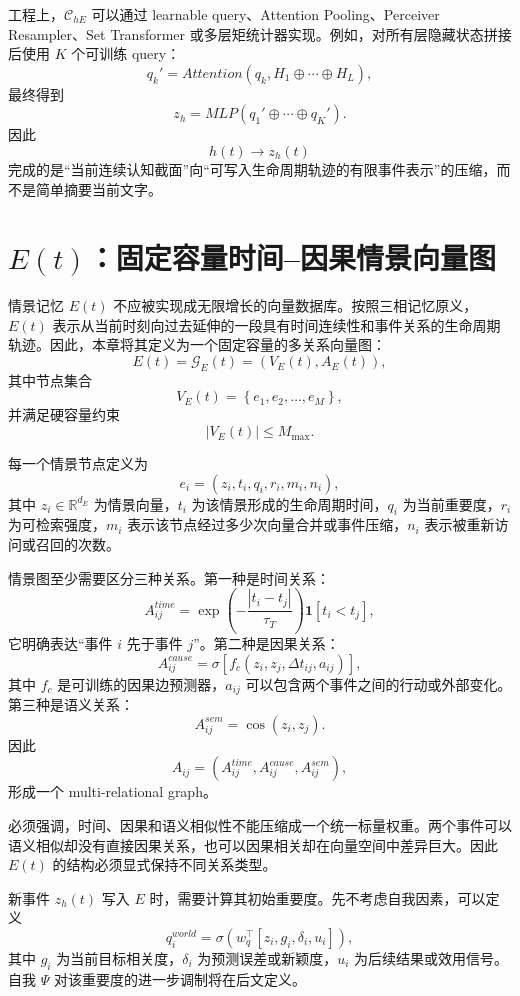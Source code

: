 工程上，$\mathcal{C}_{hE}$ 可以通过 learnable query、Attention Pooling、Perceiver Resampler、Set Transformer 或多层矩统计器实现。例如，对所有层隐藏状态拼接后使用 $K$ 个可训练 query：
\[
q_k'
=
Attention
\left(
q_k,
H_1\oplus\cdots\oplus H_L
\right),
\]
最终得到
\[
z_h
=
MLP
\left(
q_1'\oplus\cdots\oplus q_K'
\right).
\]
因此
\[
\boxed{
h(t)
\rightarrow
z_h(t)
}
\]
完成的是“当前连续认知截面”向“可写入生命周期轨迹的有限事件表示”的压缩，而不是简单摘要当前文字。

\section{$E(t)$：固定容量时间--因果情景向量图}

情景记忆 $E(t)$ 不应被实现成无限增长的向量数据库。按照三相记忆原义，$E(t)$ 表示从当前时刻向过去延伸的一段具有时间连续性和事件关系的生命周期轨迹。因此，本章将其定义为一个固定容量的多关系向量图：
\[
E(t)
=
\mathcal{G}_E(t)
=
\left(
V_E(t),A_E(t)
\right),
\]
其中节点集合
\[
V_E(t)
=
\left\{
e_1,e_2,\ldots,e_M
\right\},
\]
并满足硬容量约束
\[
|V_E(t)|
\leq
M_{\max}.
\]

每一个情景节点定义为
\[
e_i
=
\left(
z_i,
t_i,
q_i,
r_i,
m_i,
n_i
\right),
\]
其中 $z_i\in\mathbb{R}^{d_E}$ 为情景向量，$t_i$ 为该情景形成的生命周期时间，$q_i$ 为当前重要度，$r_i$ 为可检索强度，$m_i$ 表示该节点经过多少次向量合并或事件压缩，$n_i$ 表示被重新访问或召回的次数。

情景图至少需要区分三种关系。第一种是时间关系：
\[
A_{ij}^{time}
=
\exp
\left(
-\frac{|t_i-t_j|}{\tau_T}
\right)
\mathbf{1}[t_i<t_j],
\]
它明确表达“事件 $i$ 先于事件 $j$”。第二种是因果关系：
\[
A_{ij}^{cause}
=
\sigma
\left[
f_c
\left(
z_i,z_j,\Delta t_{ij},a_{ij}
\right)
\right],
\]
其中 $f_c$ 是可训练的因果边预测器，$a_{ij}$ 可以包含两个事件之间的行动或外部变化。第三种是语义关系：
\[
A_{ij}^{sem}
=
\cos
\left(
z_i,z_j
\right).
\]
因此
\[
A_{ij}
=
\left(
A_{ij}^{time},
A_{ij}^{cause},
A_{ij}^{sem}
\right),
\]
形成一个 multi-relational graph。

必须强调，时间、因果和语义相似性不能压缩成一个统一标量权重。两个事件可以语义相似却没有直接因果关系，也可以因果相关却在向量空间中差异巨大。因此 $E(t)$ 的结构必须显式保持不同关系类型。

新事件 $z_h(t)$ 写入 $E$ 时，需要计算其初始重要度。先不考虑自我因素，可以定义
\[
q_i^{world}
=
\sigma
\left(
w_q^\top
\left[
z_i,g_i,\delta_i,u_i
\right]
\right),
\]
其中 $g_i$ 为当前目标相关度，$\delta_i$ 为预测误差或新颖度，$u_i$ 为后续结果或效用信号。自我 $\Psi$ 对该重要度的进一步调制将在后文定义。

